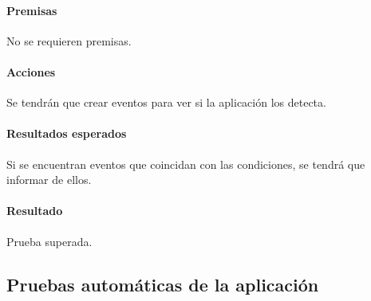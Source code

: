 \paragraph{Premisas}
No se requieren premisas.

\paragraph{Acciones}
Se tendrán que crear eventos para ver si la aplicación los detecta.

\paragraph{Resultados esperados}
Si se encuentran eventos que coincidan con las condiciones, se tendrá que informar de ellos.

\paragraph{Resultado}
Prueba superada.

\subsection{Pruebas automáticas de la aplicación}


